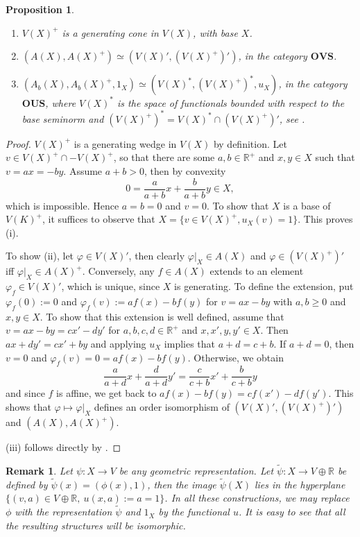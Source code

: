 \documentclass[12pt,letterpaper]{article}
\newtheorem{proposition}[lemma]{Proposition}
\newtheorem{remark}[lemma]{Remark}
\newcommand{\ct}[1]{\mathbf{#1}}
\newcommand{\<}{\langle}
\begin{document}
\begin{proposition}\label{prop:XBN}
\begin{enumerate}
\item[(i)] $V(X)^+$ is a generating cone in $V(X)$, with base $X$.
\item[(ii)] $(A(X),A(X)^+)\simeq (V(X)',(V(X)^+)')$, in the category $\ct{OVS}$.
\item[(iii)] $(A_b(X),A_b(X)^+,1_X)\simeq (V(X)^*,(V(X)^+)^*,u_X)$, in the category $\ct{OUS}$, where $V(X)^*$ is the space of functionals bounded with respect to the base seminorm and $(V(X)^+)^*=V(X)^*\cap (V(X)^+)'$, see \cite{ovs}.
\end{enumerate}

\end{proposition}

\begin{proof} $V(X)^+$ is a generating wedge in $V(X)$ by definition. Let $v\in V(X)^+\cap -V(X)^+$, so that there are some $a,b\in \mathbb R^+$ and $x,y\in X$ such that 
$v=ax=-by$. Assume $a+b>0$, then by convexity 
\[
0=\frac a{a+b}x+\frac b{a+b}y\in X,
\]
 which is impossible. Hence $a=b=0$ and $v=0$. To show that $X$ is a base of $V(K)^+$, it suffices to observe that $X=\{v\in V(X)^+, u_X(v)=1\}$. This proves (i).

To show (ii), let $\varphi\in V(X)'$, then clearly $\varphi|_X\in A(X)$ and $\varphi\in (V(X)^+)'$ iff $\varphi|_X\in A(X)^+$. Conversely, any  $f\in A(X)$ extends to an element $\varphi_f\in V(X)'$, which is unique, since 
 $X$ is generating. To define the extension, put  $\varphi_f(0):=0$ and  $\varphi_f(v):=af(x)-bf(y)$ for  $v=ax-by$ with $a,b\ge 0$ and $x,y\in X$. 
 To show that this  extension is well defined, assume that $v=ax-by=cx'-dy'$ for $a,b,c,d\in \mathbb R^+$ and $x,x',y,y'\in X$. Then $ax+dy'=cx'+by$ and applying $u_X$ implies that $a+d=c+b$.
 If $a+d=0$, then $v=0$ and $\varphi_f(v)=0=af(x)-bf(y)$. Otherwise, we obtain 
 \[
\frac a{a+d}x+ \frac d{a+d}y'=\frac c{c+b} x'+\frac b{c+b} y
 \]
and since $f$ is affine, we get back to $af(x)-bf(y)=cf(x')-df(y')$. This shows that  $\varphi\mapsto \varphi|_X$ defines an order isomorphism of $(V(X)',(V(X)^+)')$ and 
$(A(X),A(X)^+)$.

(iii) follows directly by \cite[Theorem 2 (iii)]{ovs}.

\end{proof}

\begin{remark} Let $\psi:X\to V$ be  any geometric representation.  Let $\tilde \psi:X\to V\oplus \mathbb R$ be defined by $\tilde \psi(x)=(\phi(x),1)$, then the image 
$\tilde \psi(X)$ lies in the hyperplane $\{(v,a)\in V\oplus \mathbb R,\ u(x,a):=a=1\}$. In all these constructions, we may replace $\phi$ with the representation $\tilde \psi$ and $1_X$ by the functional $u$.  It is easy to see that all the resulting structures will be isomorphic.

\end{remark}
\end{document}
